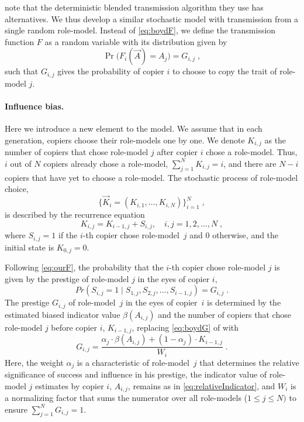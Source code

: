 \documentclass[11pt]{article}
\begin{document}
\citet{evolutionBook} note that the deterministic blended transmission algorithm they use has alternatives. We thus develop a similar stochastic model with transmission from a single random role-model. Instead of \cref{eq:boydF}, we define the transmission function $F$ as a random variable with its distribution given by 
\begin{equation}\label{eq:ourF}
\Pr\big(F_i(\vec{A}) = A_{j}\big) = G_{i,j} \;,
\end{equation}
such that $G_{i,j}$ gives the probability of copier $i$ to choose to copy the trait of role-model $j$.

\paragraph{Influence bias.}
Here we introduce a new element to the model.
We assume that in each generation, copiers choose their role-models one by one.
We denote $K_{i,j}$ as the number of copiers that chose role-model $j$ after copier $i$ chose a role-model. Thus, $i$ out of $N$ copiers already chose a role-model, $\sum_{j=1}^N{K_{i,j}} = i$, and there are $N-i$ copiers that have yet to choose a role-model.
The stochastic process of role-model choice, 
\begin{equation} \label{eq:process}
\big\{\vec{K}_i = (K_{i,1}, \ldots, K_{i,N}) \big\}_{i=1}^N \;,
\end{equation}
is described by the recurrence equation
\begin{equation} \label{eq:recurrence}
K_{i,j} = K_{i-1,j} + S_{i,j}, \quad i,j=1,2,\ldots,N \;,
\end{equation}
where $S_{i,j}=1$ if the $i$-th copier chose role-model~$j$ and 0 otherwise, and the initial state is $K_{0,j}=0$.

Following \cref{eq:ourF}, the probability that the $i$-th copier chose role-model $j$ is given by the prestige of role-model $j$ in the eyes of copier $i$,
\begin{equation}\label{eq:recPrestige}
Pr(S_{i,j}=1 \mid S_{1,j},S_{2,j},...,S_{i-1,j}) = G_{i,j} \;.
\end{equation}
The prestige $G_{i,j}$ of role-model~$j$ in the eyes of copier~$i$ is determined by the estimated biased indicator value $\beta(A_{i,j})$ and the number of copiers that chose role-model $j$ before copier $i$, $K_{i-1,j}$, replacing \cref{eq:boydG} of \citet{evolutionBook} with
\begin{equation}\label{eq:prestige}
G_{i,j} = \frac{\alpha_j \cdot \beta(A_{i,j}) + (1-\alpha_j) \cdot K_{i-1,j}}{W_i} \;.
\end{equation}
Here, the weight $\alpha_j$ is a characteristic of role-model~$j$ that determines the relative significance of success and influence in his prestige, the indicator value of role-model $j$ estimates by copier $i$, $A_{i,j}$, remains as in \cref{eq:relativeIndicator}, and $W_i$ is a normalizing factor that sums the numerator over all role-models ($1\le j \le N)$ to ensure $\sum_{j=1}^{N}{G_{i,j}}=1$.
\end{document}
